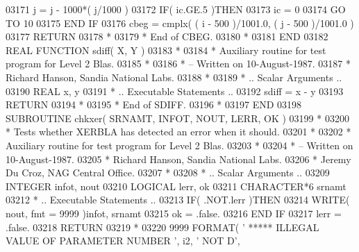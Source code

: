 \begin{DoxyCode}
03171       j = j - 1000*( j/1000 )
03172       \textcolor{keywordflow}{IF}( ic.GE.5 )\textcolor{keywordflow}{THEN}
03173          ic = 0
03174          \textcolor{keywordflow}{GO TO} 10
03175 \textcolor{keywordflow}{      END IF}
03176       cbeg = cmplx( ( i - 500 )/1001.0, ( j - 500 )/1001.0 )
03177       \textcolor{keywordflow}{RETURN}
03178 \textcolor{comment}{*}
03179 \textcolor{comment}{*     End of CBEG.}
03180 \textcolor{comment}{*}
03181 \textcolor{keyword}{      END}
03182 \textcolor{keyword}{      REAL }\textcolor{keyword}{FUNCTION }sdiff( X, Y )
03183 \textcolor{comment}{*}
03184 \textcolor{comment}{*  Auxiliary routine for test program for Level 2 Blas.}
03185 \textcolor{comment}{*}
03186 \textcolor{comment}{*  -- Written on 10-August-1987.}
03187 \textcolor{comment}{*     Richard Hanson, Sandia National Labs.}
03188 \textcolor{comment}{*}
03189 \textcolor{comment}{*     .. Scalar Arguments ..}
03190       \textcolor{keywordtype}{REAL}               x, y
03191 \textcolor{comment}{*     .. Executable Statements ..}
03192       sdiff = x - y
03193       \textcolor{keywordflow}{RETURN}
03194 \textcolor{comment}{*}
03195 \textcolor{comment}{*     End of SDIFF.}
03196 \textcolor{comment}{*}
03197 \textcolor{keyword}{      END}
03198 \textcolor{keyword}{      SUBROUTINE }chkxer( SRNAMT, INFOT, NOUT, LERR, OK )
03199 \textcolor{comment}{*}
03200 \textcolor{comment}{*  Tests whether XERBLA has detected an error when it should.}
03201 \textcolor{comment}{*}
03202 \textcolor{comment}{*  Auxiliary routine for test program for Level 2 Blas.}
03203 \textcolor{comment}{*}
03204 \textcolor{comment}{*  -- Written on 10-August-1987.}
03205 \textcolor{comment}{*     Richard Hanson, Sandia National Labs.}
03206 \textcolor{comment}{*     Jeremy Du Croz, NAG Central Office.}
03207 \textcolor{comment}{*}
03208 \textcolor{comment}{*     .. Scalar Arguments ..}
03209       \textcolor{keywordtype}{INTEGER}            infot, nout
03210       \textcolor{keywordtype}{LOGICAL}            lerr, ok
03211       \textcolor{keywordtype}{CHARACTER*6}        srnamt
03212 \textcolor{comment}{*     .. Executable Statements ..}
03213       \textcolor{keywordflow}{IF}( .NOT.lerr )\textcolor{keywordflow}{THEN}
03214          \textcolor{keyword}{WRITE}( nout, fmt = 9999 )infot, srnamt
03215          ok = .false.
03216 \textcolor{keywordflow}{      END IF}
03217       lerr = .false.
03218       \textcolor{keywordflow}{RETURN}
03219 \textcolor{comment}{*}
03220  9999 \textcolor{keyword}{FORMAT}( \textcolor{stringliteral}{' ***** ILLEGAL VALUE OF PARAMETER NUMBER '}, i2, \textcolor{stringliteral}{' NOT D'},

\end{DoxyCode}
